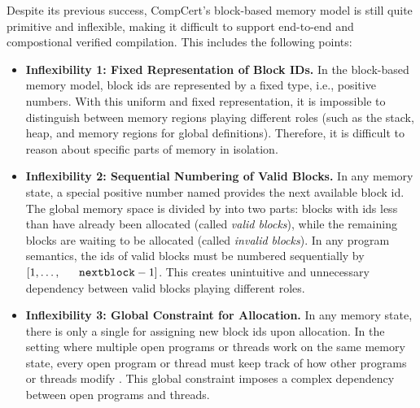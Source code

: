 Despite its previous success, CompCert's block-based memory model is
still quite primitive and inflexible, making it difficult to support
end-to-end and compostional verified compilation. This includes
the following points:
%
\begin{itemize}
\item 
\textbf{Inflexibility 1: Fixed Representation of Block IDs.}
%
In the block-based memory model, block ids are represented by a fixed
type, i.e., positive numbers. With this uniform and fixed
representation, it is impossible to distinguish between memory regions
playing different roles (such as the stack, heap, and memory regions
for global definitions). Therefore, it is difficult to reason about
specific parts of memory in isolation.

\item
\textbf{Inflexibility 2: Sequential Numbering of Valid Blocks.}  
%
In any memory state, a special positive number named \nextblock
provides the next available block id. The global memory space is
divided by \nextblock into two parts: blocks with ids less than
\nextblock have already been allocated (called \emph{valid blocks}),
while the remaining blocks are waiting to be allocated (called
\emph{invalid blocks}). In any program semantics, the ids of valid
blocks must be numbered sequentially by $[1,\ldots,\nextblock-1]$.
This creates unintuitive and unnecessary dependency between valid
blocks playing different roles.

\item
\textbf{Inflexibility 3: Global Constraint for Allocation.}
%
In any memory state, there is only a single \nextblock for assigning
new block ids upon allocation. In the setting where multiple open
programs or threads work on the same memory state, every open program or
thread must keep track of how other programs or threads modify
\nextblock. This global constraint imposes a complex dependency between
open programs and threads.

\end{itemize}

